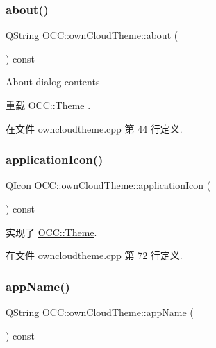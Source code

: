 \subsubsection{\texorpdfstring{about()}{about()}}
{\footnotesize\ttfamily Q\+String O\+C\+C\+::own\+Cloud\+Theme\+::about (\begin{DoxyParamCaption}{ }\end{DoxyParamCaption}) const\hspace{0.3cm}{\ttfamily [virtual]}}

About dialog contents 

重载 \hyperlink{class_o_c_c_1_1_theme_a0fb376868cffa1e0fab810c9f9b9c4e5}{O\+C\+C\+::\+Theme} .



在文件 owncloudtheme.\+cpp 第 44 行定义.

\mbox{\label{class_o_c_c_1_1own_cloud_theme_a45975f531c5c2c1f7e699f53d55d786e}} 
\subsubsection{\texorpdfstring{application\+Icon()}{applicationIcon()}}
{\footnotesize\ttfamily Q\+Icon O\+C\+C\+::own\+Cloud\+Theme\+::application\+Icon (\begin{DoxyParamCaption}{ }\end{DoxyParamCaption}) const\hspace{0.3cm}{\ttfamily [virtual]}}



实现了 \hyperlink{class_o_c_c_1_1_theme_a379b81bad736957d69add51e2355be38}{O\+C\+C\+::\+Theme}.



在文件 owncloudtheme.\+cpp 第 72 行定义.

\mbox{\label{class_o_c_c_1_1own_cloud_theme_a96f74e2ad1c65799f9bd3955cc4c50ee}} 
\subsubsection{\texorpdfstring{app\+Name()}{appName()}}
{\footnotesize\ttfamily Q\+String O\+C\+C\+::own\+Cloud\+Theme\+::app\+Name (\begin{DoxyParamCaption}{ }\end{DoxyParamCaption}) const\hspace{0.3cm}{\ttfamily [virtual]}}




